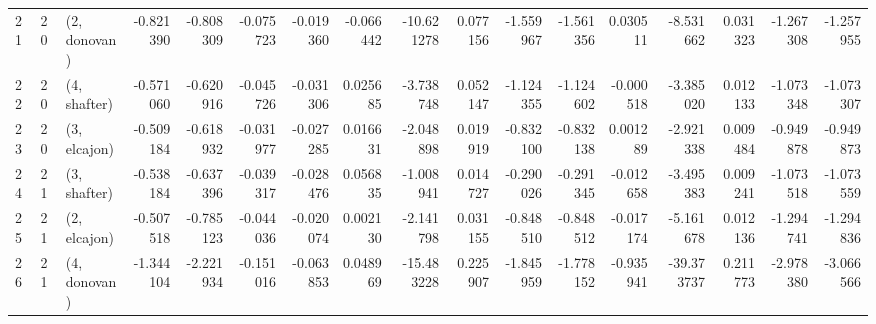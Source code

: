 \begin{tabular}{lllrrrrrrrrrrrrrr}
21 &    20 &  (2, donovan) & -0.821390 & -0.808309 &  -0.075723 & -0.019360 & -0.066442 & -10.621278 &  0.077156 &  -1.559967 & -1.561356 &  0.030511 &  -8.531662 &  0.031323 & -1.267308 & -1.257955 \\
22 &    20 &  (4, shafter) & -0.571060 & -0.620916 &  -0.045726 & -0.031306 &  0.025685 &  -3.738748 &  0.052147 &  -1.124355 & -1.124602 & -0.000518 &  -3.385020 &  0.012133 & -1.073348 & -1.073307 \\
23 &    20 &  (3, elcajon) & -0.509184 & -0.618932 &  -0.031977 & -0.027285 &  0.016631 &  -2.048898 &  0.019919 &  -0.832100 & -0.832138 &  0.001289 &  -2.921338 &  0.009484 & -0.949878 & -0.949873 \\
24 &    21 &  (3, shafter) & -0.538184 & -0.637396 &  -0.039317 & -0.028476 &  0.056835 &  -1.008941 &  0.014727 &  -0.290026 & -0.291345 & -0.012658 &  -3.495383 &  0.009241 & -1.073518 & -1.073559 \\
25 &    21 &  (2, elcajon) & -0.507518 & -0.785123 &  -0.044036 & -0.020074 &  0.002130 &  -2.141798 &  0.031155 &  -0.848510 & -0.848512 & -0.017174 &  -5.161678 &  0.012136 & -1.294741 & -1.294836 \\
26 &    21 &  (4, donovan) & -1.344104 & -2.221934 &  -0.151016 & -0.063853 &  0.048969 & -15.483228 &  0.225907 &  -1.845959 & -1.778152 & -0.935941 & -39.373737 &  0.211773 & -2.978380 & -3.066566 \\
\bottomrule
\end{tabular}
